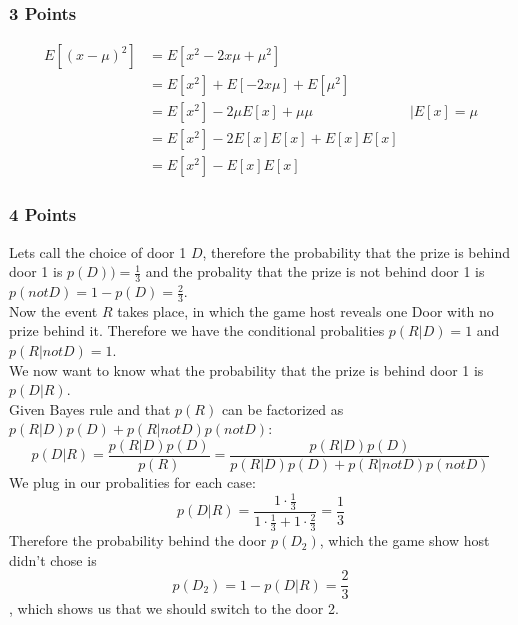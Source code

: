 \subsubsection{3 Points}
\begin{align*}
E[(x-\mu)^2] &= E[x^2-2 x \mu + \mu^2]\\
&= E[x^2] + E[-2 x \mu] + E[\mu^2]\\
&=  E[x^2] -2 \mu E[x] +  \mu \mu & | E[x]=\mu\\
&=  E[x^2] -2 E[x] E[x] +  E[x] E[x] \\
&=  E[x^2] -  E[x] E[x] 
\end{align*}
\subsubsection{4 Points}
Lets call the choice of  door 1 $D$, therefore the probability that the prize is behind door 1 is $p(D))=\frac{1}{3}$ and the probality that the prize is not behind door 1 is $p(not D) = 1- p(D) = \frac{2}{3}$.\\ Now the event $R$ takes place, in which the game host reveals one Door with no prize behind it. Therefore we have the conditional probalities $p(R|D) = 1$ and $p(R|not D) = 1$.\\ We now want to know what the probability that the prize is behind door 1 is $p(D|R)$.\\
Given Bayes rule and that $p(R)$ can be factorized as $p(R|D)p(D) + p(R|not D)p(not D)$:
 $$p(D|R)= \frac{p(R|D)p(D)}{p(R)}= \frac{p(R|D)p(D)}{p(R|D)p(D) + p(R|not D)p(not D)} $$ 
 We plug in our probalities for each case:
 $$ p(D|R)= \frac{1\cdot \frac{1}{3}}{1\cdot  \frac{1}{3} +1 \cdot  \frac{2}{3}} =  \frac{1}{3} $$
 Therefore the probability behind the door $p(D_2)$,  which the game show host didn't chose is
 $$p(D_2) = 1 - p(D|R) = \frac{2}{3}$$
 , which shows us that we should switch to the door 2.